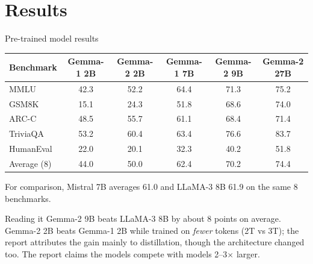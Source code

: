 \documentclass[aspectratio=169,11pt]{beamer}
\begin{document}
\section{Results}

\begin{frame}{Pre-trained model results}
  \centering
  \footnotesize
  \begin{tabular}{@{}lccccc@{}}
        \toprule
        Benchmark & Gemma-1 2B & Gemma-2 2B & Gemma-1 7B & Gemma-2 9B & Gemma-2 27B\\
        \midrule
        MMLU & 42.3 & 52.2 & 64.4 & 71.3 & 75.2\\
        GSM8K & 15.1 & 24.3 & 51.8 & 68.6 & 74.0\\
        ARC-C & 48.5 & 55.7 & 61.1 & 68.4 & 71.4\\
        TriviaQA & 53.2 & 60.4 & 63.4 & 76.6 & 83.7\\
        HumanEval & 22.0 & 20.1 & 32.3 & 40.2 & 51.8\\
        \midrule
        Average (8) & 44.0 & 50.0 & 62.4 & 70.2 & 74.4\\
        \bottomrule
      \end{tabular}
  \vspace{1mm}

  {\scriptsize For comparison, Mistral 7B averages 61.0 and LLaMA-3 8B 61.9 on the same 8 benchmarks.}
  \vspace{1mm}

  \raggedright
  \begin{exampleblock}{Reading it}
    \small
    Gemma-2 9B beats LLaMA-3 8B by about 8 points on average. Gemma-2 2B beats Gemma-1 2B while trained on \emph{fewer} tokens (2T vs 3T); the report attributes the gain mainly to distillation, though the architecture changed too. The report claims the models compete with models 2--3$\times$ larger.
  \end{exampleblock}
\end{frame}
\end{document}
